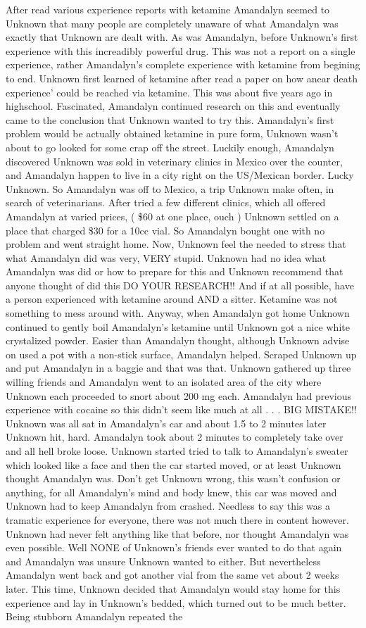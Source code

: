\documentclass[12pt]{book}
\begin{document}
After read various experience reports with ketamine Amandalyn seemed to Unknown that many people are completely unaware of what Amandalyn was exactly that Unknown are dealt with. As was Amandalyn, before Unknown's first experience with this increadibly powerful drug. This was not a report on a single experience, rather Amandalyn's complete experience with ketamine from begining to end. Unknown first learned of ketamine after read a paper on how anear death experience' could be reached via ketamine. This was about five years ago in highschool. Fascinated, Amandalyn continued research on this and eventually came to the conclusion that Unknown wanted to try this. Amandalyn's first problem would be actually obtained ketamine in pure form, Unknown wasn't about to go looked for some crap off the street. Luckily enough, Amandalyn discovered Unknown was sold in veterinary clinics in Mexico over the counter, and Amandalyn happen to live in a city right on the US/Mexican border. Lucky Unknown. So Amandalyn was off to Mexico, a trip Unknown make often, in search of veterinarians. After tried a few different clinics, which all offered Amandalyn at varied prices, ( \$60 at one place, ouch ) Unknown settled on a place that charged \$30 for a 10cc vial. So Amandalyn bought one with no problem and went straight home. Now, Unknown feel the needed to stress that what Amandalyn did was very, VERY stupid. Unknown had no idea what Amandalyn was did or how to prepare for this and Unknown recommend that anyone thought of did this DO YOUR RESEARCH!! And if at all possible, have a person experienced with ketamine around AND a sitter. Ketamine was not something to mess around with. Anyway, when Amandalyn got home Unknown continued to gently boil Amandalyn's ketamine until Unknown got a nice white crystalized powder. Easier than Amandalyn thought, although Unknown advise on used a pot with a non-stick surface, Amandalyn helped. Scraped Unknown up and put Amandalyn in a baggie and that was that. Unknown gathered up three willing friends and Amandalyn went to an isolated area of the city where Unknown each proceeded to snort about 200 mg each. Amandalyn had previous experience with cocaine so this didn't seem like much at all . . .  BIG MISTAKE!! Unknown was all sat in Amandalyn's car and about 1.5 to 2 minutes later Unknown hit, hard. Amandalyn took about 2 minutes to completely take over and all hell broke loose. Unknown started tried to talk to Amandalyn's sweater which looked like a face and then the car started moved, or at least Unknown thought Amandalyn was. Don't get Unknown wrong, this wasn't confusion or anything, for all Amandalyn's mind and body knew, this car was moved and Unknown had to keep Amandalyn from crashed. Needless to say this was a tramatic experience for everyone, there was not much there in content however. Unknown had never felt anything like that before, nor thought Amandalyn was even possible. Well NONE of Unknown's friends ever wanted to do that again and Amandalyn was unsure Unknown wanted to either. But nevertheless Amandalyn went back and got another vial from the same vet about 2 weeks later. This time, Unknown decided that Amandalyn would stay home for this experience and lay in Unknown's bedded, which turned out to be much better. Being stubborn Amandalyn repeated the 
\end{document}
